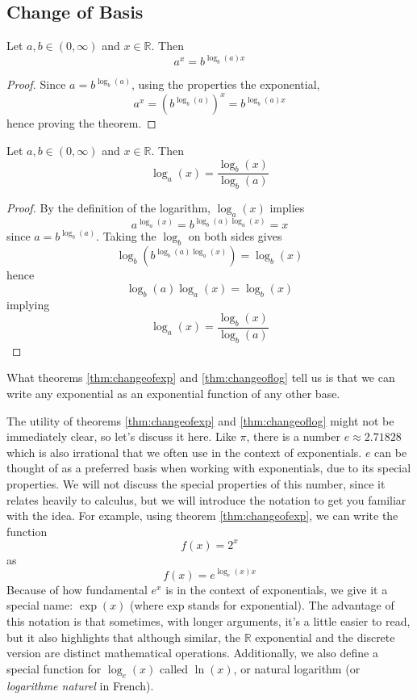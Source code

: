 \documentclass[11pt]{article}
\numberwithin{lemma}{section}
\numberwithin{equation}{section}
\numberwithin{define}{section}
\numberwithin{prop}{section}
\numberwithin{figure}{section}
\numberwithin{theorem}{section}
\numberwithin{cor}{section}
\newcounter{ex}[section]
\numberwithin{ex}{section}
\def\real{\mathbb{R}}
\begin{document}
\subsection{Change of Basis}
\begin{theorem}
Let $a,b\in(0,\infty)$ and $x\in\real$. Then
$$a^x=b^{\log_b(a)x}$$
\label{thm:changeofexp}
\end{theorem}
\begin{proof}
	Since $a=b^{\log_b(a)}$, using the properties the exponential,
	$$a^x=(b^{\log_b(a)})^x=b^{\log_b(a)x}$$
	hence proving the theorem.
\end{proof}

\begin{theorem}
	Let $a,b\in(0,\infty)$ and $x\in\real$. Then
	$$\log_a(x)=\frac{\log_b(x)}{\log_b(a)}$$

	\label{thm:changeoflog}
\end{theorem}
\begin{proof}
	By the definition of the logarithm, $\log_a(x)$ implies
	$$a^{\log_a(x)}=b^{\log_b(a)\log_a(x)}=x$$
	since $a=b^{\log_b(a)}$.
	Taking the $\log_b$ on both sides gives
	$$\log_b(b^{\log_b(a)\log_a(x)})=\log_b(x)$$
	hence
	$$\log_b(a)\log_a(x)=\log_b(x)$$
	implying
	$$\log_a(x)=\frac{\log_b(x)}{\log_b(a)}$$
\end{proof}

What theorems \eqref{thm:changeofexp} and \eqref{thm:changeoflog} tell us is that we can write any exponential as an exponential function of any other base.

The utility of theorems \eqref{thm:changeofexp} and \eqref{thm:changeoflog} might not be immediately clear, so let's discuss it here.
Like $\pi$, there is a number $e\approx 2.71828$ which is also irrational that we often use in the context of exponentials. $e$ can be thought of as a preferred basis when working with exponentials, due to its special properties.
We will not discuss the special properties of this number, since it relates heavily to calculus, but we will introduce the notation to get you familiar with the idea.
For example, using theorem \eqref{thm:changeofexp}, we can write the function
$$f(x)=2^x$$
as
$$f(x)=e^{\log_e(x)x}$$
Because of how fundamental $e^x$ is in the context of exponentials, we give it a special name: $\exp(x)$ (where exp stands for exponential).
The advantage of this notation is that sometimes, with longer arguments, it's a little easier to read, but it also highlights that although similar, the $\real$ exponential and the discrete version are distinct mathematical operations.
Additionally, we also define a special function for $\log_e(x)$ called $\ln(x)$, or natural logarithm (or \textit{logarithme naturel}  in French).
\end{document}
